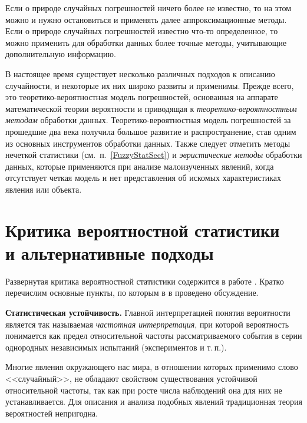 \documentclass[a5paper,openany]{book}
\begin{document}
{{Если о природе случайных погрешностей ничего более не известно, то на этом можно 
и нужно остановиться и применять далее аппроксимационные методы. Если о природе 
случайных погрешностей известно что-то определенное, то можно применить для обработки 
данных более точные методы, учитывающие дополнительную информацию. 

В настоящее время существует несколько различных подходов к описанию 
случайности, и некоторые их них широко развиты и применимы. Прежде всего, 
это теоретико-вероятностная модель погрешностей, основанная на аппарате математической 
теории вероятности и приводящая к \emph{теоретико-вероятностным методам} обработки 
данных. 
Теоретико-вероятностная модель погрешностей за прошедшие два 
века получила большое развитие и распространение, став одним из основных 
инструментов обработки данных. Также следует отметить методы нечеткой статистики 
(см.~п.~\ref{FuzzyStatSect}) 
и \emph{эвристические методы} обработки данных, которые 
применяются при анализе малоизученных явлений, когда отсутствует четкая модель и нет 
представления об искомых характеристиках явления или объекта.  

	\section{Критика вероятностной статистики \\  и альтернативные подходы} 

Развернутая критика вероятностной статистики  содержится в работе \cite{MetodikaBook}. Кратко перечислим основные пункты, по которым в  в  \cite{MetodikaBook} проведено обсуждение.

{\bf Статистическая устойчивость.} 
Главной интерпретацией   
понятия вероятности является так называемая \emph{частотная интерпретация}, при 
которой вероятность понимается как предел относительной частоты рассматриваемого 
события в серии однородных независимых испытаний (экспериментов и т.\,п.). 

Многие явления окружающего нас мира, в отношении которых применимо слово <<случайный>>, не обладают свойством существования устойчивой относительной 
частоты, так как при росте числа наблюдений она для них не устанавливается. 
Для описания и анализа подобных явлений традиционная теория вероятностей непригодна. 

}}
\end{document}
